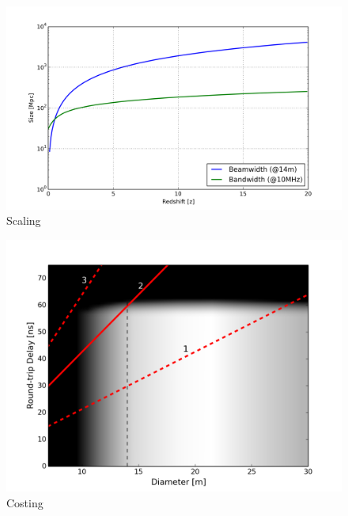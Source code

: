 \documentclass[ars]{/Users/daviddeboer1/Documents/Papers/Copernicus_LaTeX_Package_v_2_7/copernicus}
\begin{document}
\begin{figure}[t]
\vspace*{2mm}
\begin{center}
\includegraphics[width=\columnwidth]{plots/heraXY.png}
\end{center}
\caption{Scaling  \label{fig:heraXY}}
\end{figure}

\begin{figure}[t]
\vspace*{2mm}
\begin{center}
\includegraphics[width=\columnwidth]{plots/costing.png}
\end{center}
\caption{Costing  \label{fig:costing}}
\end{figure}
\end{document}
